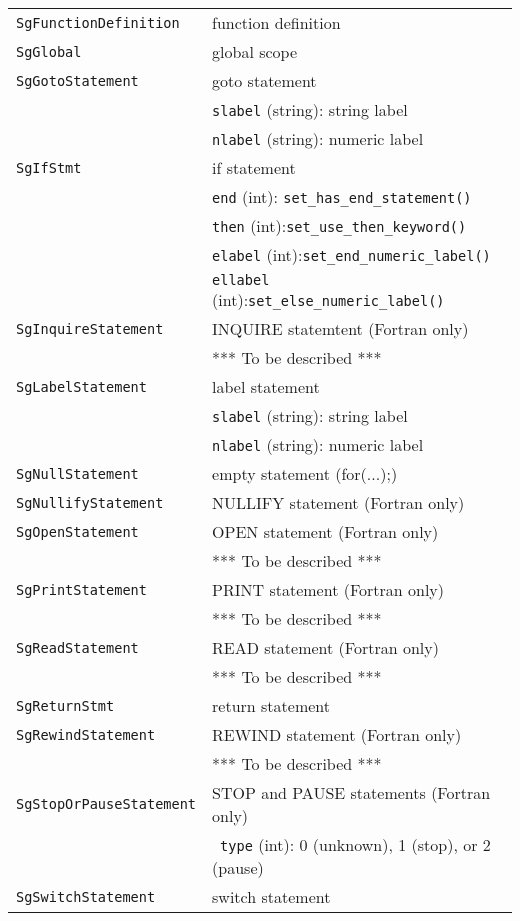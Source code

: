 \begin{longtable}[l]{l|p{10cm}}
 \texttt{SgFunctionDefinition}& function definition\\
 \texttt{SgGlobal}& global scope\\
 \texttt{SgGotoStatement}& goto statement\\
 & \texttt{slabel} (string): string label\\
 & \texttt{nlabel} (string): numeric label\\
 \texttt{SgIfStmt}& if statement\\
 & \texttt{end} (int): \texttt{set\_has\_end\_statement()}\\
 & \texttt{then} (int):\texttt{set\_use\_then\_keyword()}\\
 & \texttt{elabel} (int):\texttt{set\_end\_numeric\_label()}\\
 & \texttt{ellabel} (int):\texttt{set\_else\_numeric\_label()}\\
 \texttt{SgInquireStatement}& INQUIRE statemtent (Fortran only)\\
 & *** To be described *** \\
 \texttt{SgLabelStatement}& label statement\\
 & \texttt{slabel} (string): string label\\
 & \texttt{nlabel} (string): numeric label\\
 \texttt{SgNullStatement}& empty statement (for(...){;})\\
 \texttt{SgNullifyStatement}& NULLIFY statement (Fortran only)\\
 \texttt{SgOpenStatement}& OPEN statement (Fortran only)\\
 & *** To be described *** \\
 \texttt{SgPrintStatement}& PRINT statement (Fortran only)\\
 & *** To be described *** \\
 \texttt{SgReadStatement}& READ statement (Fortran only)\\
 & *** To be described *** \\
 \texttt{SgReturnStmt}& return statement\\
 \texttt{SgRewindStatement}& REWIND statement (Fortran only)\\
 & *** To be described *** \\
 \texttt{SgStopOrPauseStatement}& STOP and PAUSE statements (Fortran only)\\
 & ~\texttt{type} (int): 0 (unknown), 1 (stop), or 2 (pause)\\
 \texttt{SgSwitchStatement}& switch statement\\

\end{longtable}
